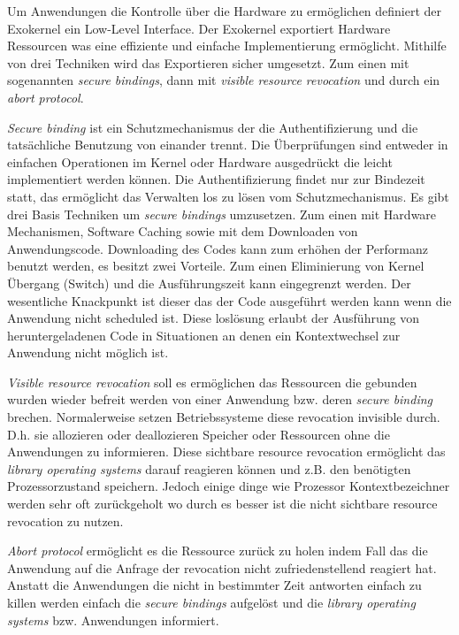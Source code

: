 \documentclass[9pt,technote]{IEEEtran}
\begin{document}
        Um Anwendungen die Kontrolle \"uber die Hardware zu erm\"oglichen definiert der Exokernel ein Low-Level Interface.
        Der Exokernel exportiert Hardware Ressourcen was eine effiziente und einfache Implementierung erm\"oglicht.
        Mithilfe von drei Techniken wird das Exportieren sicher umgesetzt. Zum einen mit sogenannten \textit{secure bindings}, 
        dann mit \textit{visible resource revocation} und durch ein \textit{abort protocol}. 
        
        \textit{Secure binding} ist ein Schutzmechanismus der die Authentifizierung und die tats\"achliche Benutzung von einander trennt.
        Die \"Uberpr\"ufungen sind entweder in einfachen Operationen im Kernel oder Hardware ausgedr\"uckt die leicht implementiert werden k\"onnen.
        Die Authentifizierung findet nur zur Bindezeit statt, das erm\"oglicht das Verwalten los zu l\"osen vom Schutzmechanismus. Es gibt drei Basis Techniken
        um \textit{secure bindings} umzusetzen. Zum einen mit Hardware Mechanismen, Software Caching sowie mit dem Downloaden von Anwendungscode.
        Downloading des Codes kann zum erh\"ohen der Performanz benutzt werden, es besitzt zwei Vorteile. Zum einen Eliminierung von Kernel \"Ubergang (Switch)
        und die Ausf\"uhrungszeit kann eingegrenzt werden. Der wesentliche Knackpunkt ist dieser das der Code ausgef\"uhrt werden kann wenn die Anwendung nicht
        scheduled ist. Diese losl\"osung erlaubt der Ausf\"uhrung von heruntergeladenen Code in Situationen an denen ein Kontextwechsel zur Anwendung nicht m\"oglich ist.
        
        \textit{Visible resource revocation} soll es erm\"oglichen das Ressourcen die gebunden wurden wieder befreit werden von einer Anwendung bzw. deren \textit{secure binding} brechen.
        Normalerweise setzen Betriebssysteme diese revocation invisible durch. D.h. sie allozieren oder deallozieren Speicher oder Ressourcen ohne die Anwendungen zu informieren.
        Diese sichtbare resource revocation erm\"oglicht das \textit{library operating systems} darauf reagieren k\"onnen und z.B. den ben\"otigten Prozessorzustand speichern.
        Jedoch einige dinge wie Prozessor Kontextbezeichner werden sehr oft zur\"uckgeholt wo durch es besser ist die nicht sichtbare resource revocation zu nutzen.
        
        \textit{Abort protocol} erm\"oglicht es die Ressource zur\"uck zu holen indem Fall das die Anwendung auf die Anfrage der revocation nicht zufriedenstellend reagiert hat.
        Anstatt die Anwendungen die nicht in bestimmter Zeit antworten einfach zu killen werden einfach die \textit{secure bindings} aufgel\"ost und die \textit{library operating systems} bzw.
        Anwendungen informiert.
        
\end{document}
